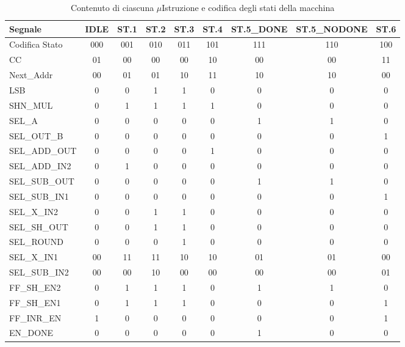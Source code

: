 \begin{table}[H]
\centering


\setlength{\tabcolsep}{4pt} %
\renewcommand{\arraystretch}{1.2} %
\begin{tabular}{|l|c|c|c|c|c|c|c|c|}
\hline
\textbf{Segnale} & \textbf{IDLE} & \textbf{ST.1} & \textbf{ST.2} & \textbf{ST.3} & \textbf{ST.4} & \textbf{ST.5\_DONE} & \textbf{ST.5\_NODONE} & \textbf{ST.6} \\ \hline
Codifica Stato & 000 & 001 & 010 & 011 & 101 & 111 & 110 & 100 \\ \hline
CC & 01 & 00 & 00 & 00 & 10 & 00 & 00 & 11 \\ \hline
Next\_Addr & 00 & 01 & 01 & 10 & 11 & 10 & 10 & 00 \\ \hline
LSB & 0 & 0 & 1 & 1 & 0 & 0 & 0 & 0 \\ \hline
SHN\_MUL & 0 & 1 & 1 & 1 & 1 & 0 & 0 & 0 \\ \hline
SEL\_A & 0 & 0 & 0 & 0 & 0 & 1 & 1 & 0 \\ \hline
SEL\_OUT\_B & 0 & 0 & 0 & 0 & 0 & 0 & 0 & 1 \\ \hline
SEL\_ADD\_OUT & 0 & 0 & 0 & 0 & 1 & 0 & 0 & 0 \\ \hline
SEL\_ADD\_IN2 & 0 & 1 & 0 & 0 & 0 & 0 & 0 & 0 \\ \hline
SEL\_SUB\_OUT & 0 & 0 & 0 & 0 & 0 & 1 & 1 & 0 \\ \hline
SEL\_SUB\_IN1 & 0 & 0 & 0 & 0 & 0 & 0 & 0 & 1 \\ \hline
SEL\_X\_IN2 & 0 & 0 & 1 & 1 & 0 & 0 & 0 & 0 \\ \hline
SEL\_SH\_OUT & 0 &0  & 1 & 1 & 0 & 0 & 0 &0 \\ \hline
SEL\_ROUND & 0 & 0 & 0 & 1 & 0 & 0 & 0 & 0 \\ \hline
SEL\_X\_IN1 & 00 & 11 & 11 & 10 & 10 & 01 &01 & 00 \\ \hline
SEL\_SUB\_IN2 & 00 & 00 & 10 & 00 & 00 & 00 & 00 & 01 \\ \hline
FF\_SH\_EN2& 0 & 1 & 1 & 1 & 0 & 1 & 1& 0  \\ \hline
FF\_SH\_EN1 & 0 & 1 & 1 & 1 & 0 & 0 & 0 & 1 \\ \hline
FF\_INR\_EN & 1 & 0 & 0 & 0 & 0 & 0 & 0 & 1 \\ \hline
EN\_DONE & 0 & 0 & 0 & 0 & 0 & 1 & 0 & 0 \\ \hline
\end{tabular}%
\caption{Contenuto di ciascuna $\mu$Istruzione e codifica degli stati della macchina}
\end{table}

